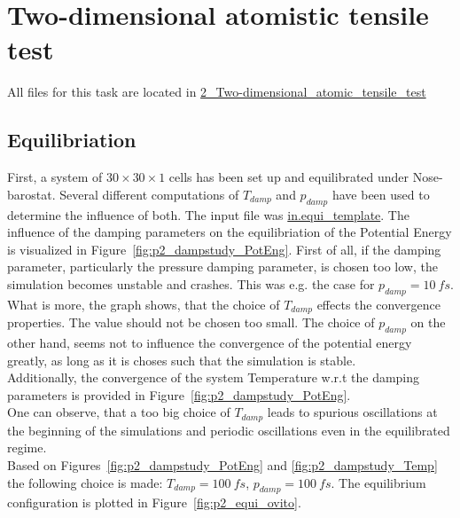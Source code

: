 \documentclass[10pt,a4paper]{report}
\def \pathparttwo {../../2_Two-dimensional_atomic_tensile_test}
\begin{document}
\FloatBarrier
\pagebreak
\chapter{Two-dimensional atomistic tensile test}
All files for this task are located in \href{\pathparttwo}{2\_Two-dimensional\_atomic\_tensile\_test}\\
\section{Equilibriation}
First, a system of $30\times30\times1$ cells has been set up and equilibrated under Nose-barostat. Several different computations of $T_{damp}$ and $p_{damp}$ have been used to determine the influence of both. The input file was \href{\pathparttwo\in.equi_template}{in.equi\_template}.
The influence of the damping parameters on the equilibriation of the Potential Energy is visualized in Figure~\ref{fig:p2_dampstudy_PotEng}.
First of all, if the damping parameter, particularly the pressure damping parameter, is chosen too low, the simulation becomes unstable and crashes. This was e.g. the case for $p_{damp}=10~fs$.\\
What is more, the graph shows, that the choice of $T_{damp}$ effects the convergence properties. The value should not be chosen too small. The choice of $p_{damp}$ on the other hand, seems not to influence the convergence of the potential energy greatly, as long as it is choses such that the simulation is stable.\\
Additionally, the convergence of the system Temperature w.r.t the damping parameters is provided in Figure~\ref{fig:p2_dampstudy_PotEng}.\\
One can observe, that a too big choice of $T_{damp}$ leads to spurious oscillations at the beginning of the simulations and periodic oscillations even in the equilibrated regime.\\

Based on Figures~\ref{fig:p2_dampstudy_PotEng} and \ref{fig:p2_dampstudy_Temp} the following choice is made: $T_{damp}=100~fs$, $p_{damp}=100~fs$.
The equilibrium configuration is plotted in Figure~\ref{fig:p2_equi_ovito}.
\end{document}
